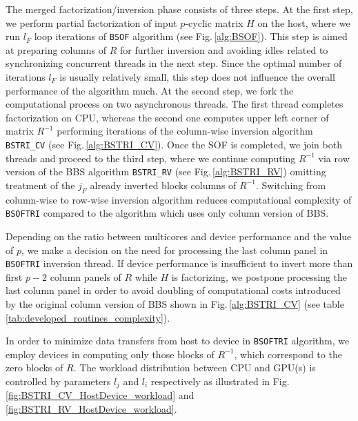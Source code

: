 \documentclass{llncs}
\newcommand{\Bsof}{\texttt{BSOF}\xspace}
\newcommand{\Bsoftri}{\texttt{BSOFTRI}\xspace}
\begin{document}
The merged factorization/inversion phase consists of three steps.
At the first step, 
we perform partial factorization of input $p$-cyclic matrix $H$ 
on the host, where we run $l_F$ loop iterations 
of \Bsof algorithm (see Fig.\,\ref{alg:BSOF}).
This step is aimed at preparing columns of $R$ for further inversion and 
avoiding idles related to synchronizing concurrent threads in the next step.
Since the optimal number of iterations $l_F$ is usually relatively small,
this step does not influence the overall performance of the algorithm much.
At the second step, 
we fork the computational process on two asynchronous threads.
The first thread completes factorization on CPU,  
whereas the second one computes upper left corner of matrix $R^{-1}$
performing iterations of the column-wise inversion 
algorithm {\tt BSTRI\_CV} (see Fig.\,\ref{alg:BSTRI_CV}).
Once the SOF is completed, 
we join both threads and proceed to the third step,
where we continue computing $R^{-1}$
via row version of the BBS algorithm {\tt BSTRI\_RV} (see Fig.\,\ref{alg:BSTRI_RV})
omitting treatment of the $j_F$ already inverted blocks columns of $R^{-1}$.
Switching from column-wise to row-wise inversion algorithm 
reduces computational complexity of \Bsoftri 
compared to the algorithm which uses only column version of BBS.

Depending on the ratio between multicores and device performance and the value of $p$, 
we make a decision on the need for processing 
the last column panel in \Bsoftri inversion thread.
If device performance is insufficient to invert 
more than first $p-2$ column panels of $R$
while $H$ is factorizing, 
we postpone processing the last column panel 
in order to avoid doubling of computational costs 
introduced by the original column version of BBS shown in Fig.\,\ref{alg:BSTRI_CV}
(see table\,\ref{tab:developed_routines_complexity}).

In order to minimize data transfers from host to device 
in \Bsoftri algorithm,
we employ devices in computing only those blocks of $R^{-1}$,
which correspond to the zero blocks of $R$. 
The workload distribution between CPU and GPU(s) is 
controlled by parameters $l_j$ and $l_i$ respectively
as illustrated in Fig.\,\ref{fig:BSTRI_CV_HostDevice_workload} and \ref{fig:BSTRI_RV_HostDevice_workload}.
\end{document}
